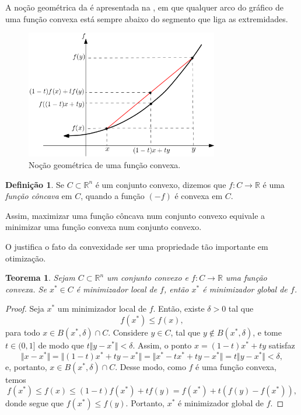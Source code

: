 \documentclass[12pt,a4paper]{scrartcl}
\def\RR{\mathds{R}}
\newtheorem{teo}{Teorema}
\theoremstyle{definition}%
\newtheorem{defi}{Definição}
\begin{document}
A noção geométrica da  é apresentada na , em que qualquer arco do gráfico de uma função convexa está sempre abaixo do segmento que liga as extremidades.

\begin{figure}[!ht] 
	\centering
	\includegraphics[width=0.75\textwidth]{nocao_geometrica_funcao_convexa}
	\caption{Noção geométrica de uma função convexa. \label{fig:nocao_funcao_convexa}}
\end{figure}

\begin{defi}
Se $C \subset \RR^{n}$ é um conjunto convexo, dizemos que $f: C \rightarrow \RR $ é uma \emph{função côncava} em $C$, quando a função $(-f)$ é convexa em $C$.
\end{defi}

Assim, maximizar uma função côncava num conjunto convexo equivale a minimizar uma função convexa num conjunto convexo.

O  justifica o fato da convexidade ser uma propriedade tão importante em otimização.

\begin{teo} \label{teo:convexidade_e_minimizador}
Sejam $C \subset \RR^{n}$ um conjunto convexo e $f:C \rightarrow \RR$ uma função convexa. Se $x^{*} \in C$ é minimizador local de $f$, então $x^{*}$ é minimizador global de $f$.
\end{teo}
\begin{proof}
Seja $x^{*}$ um minimizador local de $f$. Então, existe $\delta > 0$ tal que 
\[
f(x^{*}) \leq f(x), 
\]
para todo $x \in B(x^{*}, \delta) \cap C$. Considere $y \in C$, tal que $y \notin B(x^{*}, \delta)$, e tome $t \in (0,1]$ de modo que $t \Vert y-x^{*} \Vert < \delta$. Assim, o ponto $x = (1-t)x^{*} + ty$ satisfaz
\[
\Vert x - x^{*} \Vert = \Vert (1-t)x^{*} + ty - x^{*} \Vert = \Vert x^{*} - tx^{*} + ty - x^{*} \Vert = t \Vert y - x^{*} \Vert < \delta ,
\]
e, portanto, $x \in B(x^{*}, \delta) \cap C$.
Desse modo, como $f$ é uma função convexa, temos
\[
f(x^{*}) \leq f(x) \leq (1-t)f(x^{*}) + tf(y) = f(x^{*}) + t(f(y)-f(x^{*})),
\]
donde segue que $f(x^{*}) \leq f(y)$.
Portanto, $x^{*}$ é minimizador global de $f$.
\end{proof}
\end{document}
